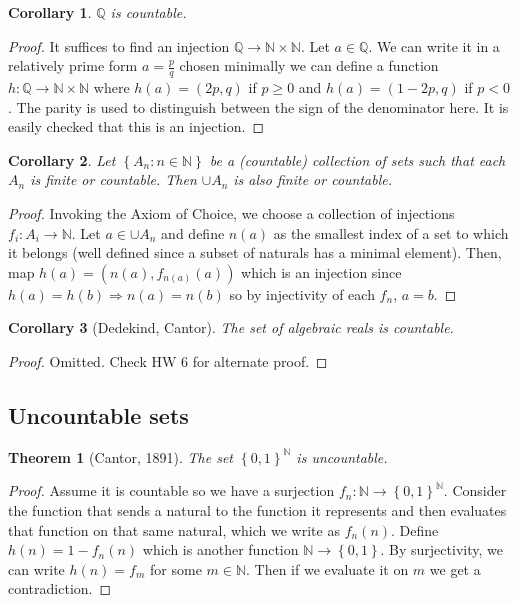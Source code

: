 \documentclass{article}
\newcommand\N{\ensuremath{\mathbb{N}}}
\newcommand\Q{\ensuremath{\mathbb{Q}}}
\newtheorem{theorem}{Theorem}[section]
\newtheorem{corollary}{Corollary}[theorem]
\theoremstyle{definition}
\theoremstyle{remark}
\theoremstyle{plain}
\begin{document}
\begin{corollary}
    \(\Q\) is countable.
\end{corollary}
\begin{proof}
    It suffices to find an injection \(\Q \to \N \times \N\). Let \(a \in \Q\). We can write it in a relatively prime form \(a = \frac{p}{q}\)
    chosen minimally we can define a function \(h: \Q \to \N \times \N\) where \(h(a) = (2p, q)\) if \(p \geq 0\) and \(h(a) = (1-2p, q)\) if \(p< 0\).
    The parity is used to distinguish between the sign of the denominator here. It is easily checked that this is an injection. 
\end{proof}

\begin{corollary}
    Let \(\left\{ A_n: n \in \N \right\}\) be a (countable) collection of sets such that each \(A_n\) is finite or countable. Then \(\cup A_n\) is also finite or countable. 
\end{corollary}
\begin{proof}
    Invoking the Axiom of Choice, we choose a collection of injections \(f_i: A_i \to \N\).
    Let \(a \in \cup A_n\) and define \(n(a)\) as the smallest index of a set to which it belongs (well defined
    since a subset of naturals has a minimal element). Then, map \(h(a) = (n(a), f_{n(a)}(a))\) which is an injection since
    \(h(a) = h(b) \Rightarrow n(a) = n(b)\) so by injectivity of each \(f_n\), \(a = b\).
\end{proof}

\begin{corollary}[Dedekind, Cantor]
    The set of algebraic reals is countable.
\end{corollary}
\begin{proof}
    Omitted. Check HW 6 for alternate proof. 
\end{proof}

\subsection{Uncountable sets}

\begin{theorem}[Cantor, 1891]
    The set \(\left\{ 0,1 \right\}^{\N}\) is uncountable.
\end{theorem}
\begin{proof}
    Assume it is countable so we have a surjection \(f_n: \N \to \left\{ 0,1 \right\}^{\N}\). Consider the function that sends a natural to 
    the function it represents and then evaluates that function on that same natural, which we write as \(f_n(n)\). Define \(h(n) = 1 - f_n(n)\) which is another
    function \(\N \to \left\{ 0,1 \right\}\). By surjectivity, we can write \(h(n) = f_m\) for some \(m \in \N\). Then if we evaluate it on \(m\) we get a contradiction.
\end{proof}
\end{document}
